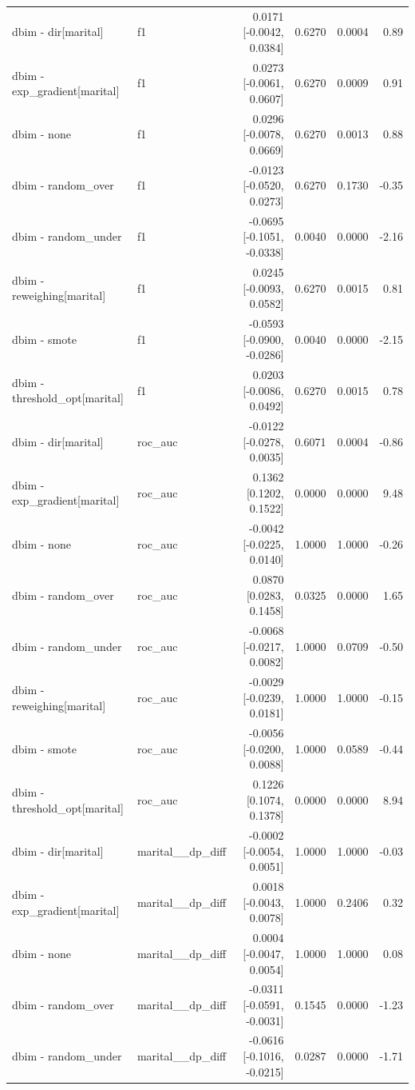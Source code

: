\begin{table}[t]
{\begin{tabular}{llrrrr}
dbim - dir[marital] & f1 & 0.0171 [-0.0042, 0.0384] & 0.6270 & 0.0004 & 0.89 \\
dbim - exp\_gradient[marital] & f1 & 0.0273 [-0.0061, 0.0607] & 0.6270 & 0.0009 & 0.91 \\
dbim - none & f1 & 0.0296 [-0.0078, 0.0669] & 0.6270 & 0.0013 & 0.88 \\
dbim - random\_over & f1 & -0.0123 [-0.0520, 0.0273] & 0.6270 & 0.1730 & -0.35 \\
dbim - random\_under & f1 & -0.0695 [-0.1051, -0.0338] & 0.0040 & 0.0000 & -2.16 \\
dbim - reweighing[marital] & f1 & 0.0245 [-0.0093, 0.0582] & 0.6270 & 0.0015 & 0.81 \\
dbim - smote & f1 & -0.0593 [-0.0900, -0.0286] & 0.0040 & 0.0000 & -2.15 \\
dbim - threshold\_opt[marital] & f1 & 0.0203 [-0.0086, 0.0492] & 0.6270 & 0.0015 & 0.78 \\
dbim - dir[marital] & roc\_auc & -0.0122 [-0.0278, 0.0035] & 0.6071 & 0.0004 & -0.86 \\
dbim - exp\_gradient[marital] & roc\_auc & 0.1362 [0.1202, 0.1522] & 0.0000 & 0.0000 & 9.48 \\
dbim - none & roc\_auc & -0.0042 [-0.0225, 0.0140] & 1.0000 & 1.0000 & -0.26 \\
dbim - random\_over & roc\_auc & 0.0870 [0.0283, 0.1458] & 0.0325 & 0.0000 & 1.65 \\
dbim - random\_under & roc\_auc & -0.0068 [-0.0217, 0.0082] & 1.0000 & 0.0709 & -0.50 \\
dbim - reweighing[marital] & roc\_auc & -0.0029 [-0.0239, 0.0181] & 1.0000 & 1.0000 & -0.15 \\
dbim - smote & roc\_auc & -0.0056 [-0.0200, 0.0088] & 1.0000 & 0.0589 & -0.44 \\
dbim - threshold\_opt[marital] & roc\_auc & 0.1226 [0.1074, 0.1378] & 0.0000 & 0.0000 & 8.94 \\
dbim - dir[marital] & marital\_\_dp\_diff & -0.0002 [-0.0054, 0.0051] & 1.0000 & 1.0000 & -0.03 \\
dbim - exp\_gradient[marital] & marital\_\_dp\_diff & 0.0018 [-0.0043, 0.0078] & 1.0000 & 0.2406 & 0.32 \\
dbim - none & marital\_\_dp\_diff & 0.0004 [-0.0047, 0.0054] & 1.0000 & 1.0000 & 0.08 \\
dbim - random\_over & marital\_\_dp\_diff & -0.0311 [-0.0591, -0.0031] & 0.1545 & 0.0000 & -1.23 \\
dbim - random\_under & marital\_\_dp\_diff & -0.0616 [-0.1016, -0.0215] & 0.0287 & 0.0000 & -1.71 \\

\end{tabular}}
\end{table}
